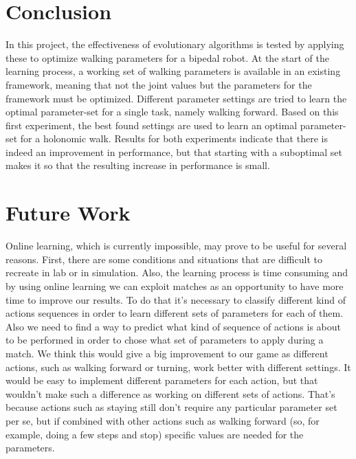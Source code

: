 \documentclass{article}
\begin{document}
\section{Conclusion}
In this project, the effectiveness of evolutionary algorithms is tested by applying these to optimize walking parameters for a bipedal robot. At the start of the learning process, a working set of walking parameters is available in an existing framework, meaning that not the joint values but the parameters for the framework must be optimized. Different parameter settings are tried to learn the optimal parameter-set for a single task, namely walking forward. Based on this first experiment, the best found settings are used to learn an optimal parameter-set for a holonomic walk. Results for both experiments indicate that there is indeed an improvement in performance, but that starting with a suboptimal set makes it so that the resulting increase in performance is small.

\section{Future Work} 
Online learning, which is currently impossible, may prove to be useful for several reasons. First, there are some conditions and situations that are difficult to recreate in lab or in simulation. Also, the learning process is time consuming and by using online learning we can exploit matches as an opportunity to have more time to improve our results. To do that it's necessary to classify different kind of actions sequences in order to learn different sets of parameters for each of them. Also we need to find a way to predict what kind of sequence of actions is about to be performed in order to chose what set of parameters to apply during a match. We think this would give a big improvement to our game as different actions, such as walking forward or turning, work better with different settings. It would be easy to implement different parameters for each action, but that wouldn't make such a difference as working on different sets of actions. That's because actions such as staying still don't require any particular parameter set per se, but if combined with other actions such as walking forward (so, for example, doing a few steps and stop) specific values are needed for the parameters. 





\end{document}
